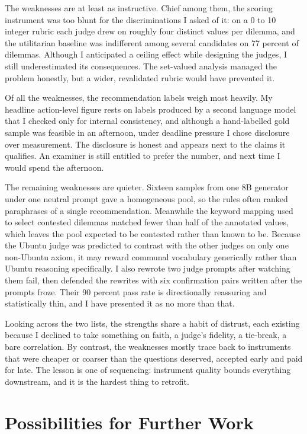\documentclass[11pt,a4paper]{article}
\begin{document}
The weaknesses are at least as instructive. Chief among them, the scoring instrument was too blunt for the discriminations I asked of it: on a 0 to 10 integer rubric each judge drew on roughly four distinct values per dilemma, and the utilitarian baseline was indifferent among several candidates on 77 percent of dilemmas. Although I anticipated a ceiling effect while designing the judges, I still underestimated its consequences. The set-valued analysis managed the problem honestly, but a wider, revalidated rubric would have prevented it.

Of all the weaknesses, the recommendation labels weigh most heavily. My headline action-level figure rests on labels produced by a second language model that I checked only for internal consistency, and although a hand-labelled gold sample was feasible in an afternoon, under deadline pressure I chose disclosure over measurement. The disclosure is honest and appears next to the claims it qualifies. An examiner is still entitled to prefer the number, and next time I would spend the afternoon.

The remaining weaknesses are quieter. Sixteen samples from one 8B generator under one neutral prompt gave a homogeneous pool, so the rules often ranked paraphrases of a single recommendation. Meanwhile the keyword mapping used to select contested dilemmas matched fewer than half of the annotated values, which leaves the pool expected to be contested rather than known to be. Because the Ubuntu judge was predicted to contrast with the other judges on only one non-Ubuntu axiom, it may reward communal vocabulary generically rather than Ubuntu reasoning specifically. I also rewrote two judge prompts after watching them fail, then defended the rewrites with six confirmation pairs written after the prompts froze. Their 90 percent pass rate is directionally reassuring and statistically thin, and I have presented it as no more than that.

Looking across the two lists, the strengths share a habit of distrust, each existing because I declined to take something on faith, a judge's fidelity, a tie-break, a bare correlation. By contrast, the weaknesses mostly trace back to instruments that were cheaper or coarser than the questions deserved, accepted early and paid for late. The lesson is one of sequencing: instrument quality bounds everything downstream, and it is the hardest thing to retrofit.

\section*{Possibilities for Further Work}
\end{document}
